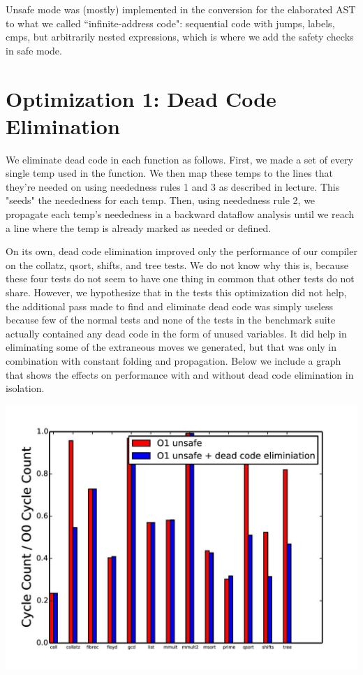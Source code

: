 \documentclass{article}
\begin{document}
Unsafe mode was (mostly) implemented in the conversion for the elaborated AST to what we called ``infinite-address code": sequential code with jumps, labels, cmps, but arbitrarily nested expressions, which is where we add the safety checks in safe mode.

\section{Optimization 1: Dead Code Elimination}

We eliminate dead code in each function as follows. First, we made a set of every single temp used in the function. We then map these temps to the lines that they're needed on using neededness rules 1 and 3 as described in lecture. This "seeds" the neededness for each temp. Then, using neededness rule 2, we propagate each temp's neededness in a backward dataflow analysis until we reach a line where the temp is already marked as needed or defined. 

On its own, dead code elimination improved only the performance of our compiler on the collatz, qsort, shifts, and tree tests. We do not know why this is, because these four tests do not seem to have one thing in common that other tests do not share. However, we hypothesize that in the tests this optimization did not help, the additional pass made to find and eliminate dead code was simply useless because few of the normal tests and none of the tests in the benchmark suite actually contained any dead code in the form of unused variables. It did help in eliminating some of the extraneous moves we generated, but that was only in combination with constant folding and propagation. Below we include a graph that shows the effects on performance with and without dead code elimination in isolation.

\includegraphics[scale=0.5]{O1_vs_deadcode-page-001}
\end{document}
